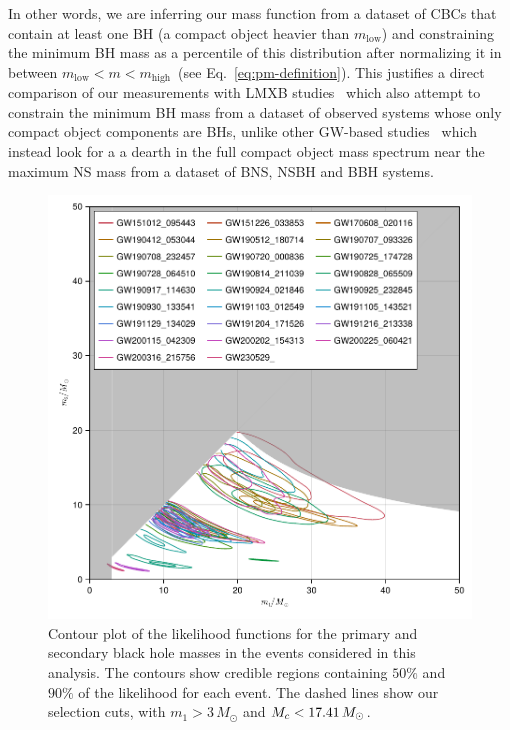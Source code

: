 \documentclass[modern]{aastex631}
\newcommand{\todo}[1]{\textcolor{red}{TODO: #1}}
\begin{document}
In other words, we are inferring our mass function from a dataset of CBCs that
contain at least one BH (a compact object heavier than $m_\mathrm{low}$) and
constraining the minimum BH mass as a percentile of this distribution after
normalizing it in between $m_\mathrm{low}<m<m_\mathrm{high}$~(see
Eq.~\eqref{eq:pm-definition}). This justifies a direct comparison of our
measurements with LMXB studies~\citep{Bailyn:1997xt, Farr:2010tu, Ozel:2010su}
which also attempt to constrain the minimum BH mass from a dataset of observed
systems whose only compact object components are BHs,  unlike other GW-based studies~\citep{Farah:2021qom}
which instead look for a a dearth in the full compact object mass spectrum near
the maximum NS mass from a dataset of BNS, NSBH and BBH systems.


\begin{figure}[htp]
    \includegraphics[width=\columnwidth]{figures/m1-m2-contour_including_230529.pdf}
    \caption{\label{fig:m1-m2-contour} Contour plot of the likelihood functions
    for the primary and secondary black hole masses in the events considered in
    this analysis.  The contours show credible regions containing $50\%$ and
    $90\%$ of the likelihood for each event.  The dashed lines show our
    selection cuts, with $m_1 > 3 \, M_\odot$ and $M_c <
    17.41 \, M_\odot$.}
\end{figure}
\newpage
\end{document}
